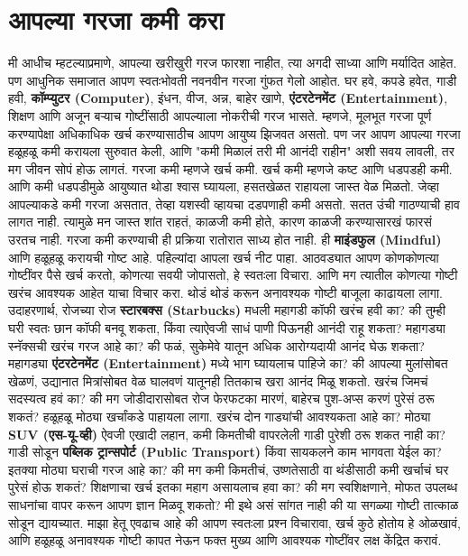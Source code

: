  \chapter{आपल्या गरजा कमी करा}
मी आधीच म्हटल्याप्रमाणे, आपल्या खरीखुरी गरज फारशा नाहीत, त्या अगदी साध्या आणि मर्यादित आहेत. पण आधुनिक समाजात आपण स्वतःभोवती नवनवीन गरजा गुंफत गेलो आहोत. घर हवे, कपडे हवेत, गाडी हवी, \textbf{कॉम्प्युटर (Computer)}, इंधन, वीज, अन्न, बाहेर खाणे, \textbf{एंटरटेनमेंट (Entertainment)}, शिक्षण आणि अजून बऱ्याच गोष्टींसाठी आपल्याला नोकरीची गरज भासते. म्हणजे, मूलभूत गरजा पूर्ण करण्यापेक्षा अधिकाधिक खर्च करण्यासाठीच आपण आयुष्य झिजवत असतो.
पण जर आपण आपल्या गरजा हळूहळू कमी करायला सुरुवात केली, आणि "कमी मिळालं तरी मी आनंदी राहीन" अशी सवय लावली, तर मग जीवन सोपं होऊ लागतं. गरजा कमी म्हणजे खर्च कमी. खर्च कमी म्हणजे कष्ट आणि धडपडही कमी. आणि कमी धडपडीमुळे आयुष्यात थोडा श्वास घ्यायला, हसतखेळत राहायला जास्त वेळ मिळतो.
जेव्हा आपल्याकडे कमी गरजा असतात, तेव्हा यशस्वी व्हायचा दडपणाही कमी असतो. सतत उंची गाठण्याची हाव लागत नाही. त्यामुळे मन जास्त शांत राहतं, काळजी कमी होते, कारण काळजी करण्यासारखं फारसं उरतच नाही.
गरजा कमी करण्याची ही प्रक्रिया रातोरात साध्य होत नाही. ही \textbf{माइंडफुल (Mindful)} आणि हळूहळू करायची गोष्ट आहे. पहिल्यांदा आपला खर्च नीट पाहा. आठवड्यात आपण कोणकोणत्या गोष्टींवर पैसे खर्च करतो, कोणत्या सवयी जोपासतो, हे स्वतःला विचारा. आणि मग त्यातील कोणत्या गोष्टी खरंच आवश्यक आहेत याचा विचार करा.
थोडं थोडं करून अनावश्यक गोष्टी बाजूला काढायला लागा. उदाहरणार्थ, रोजच्या रोज \textbf{स्टारबक्स (Starbucks)} मधली महागडी कॉफी खरंच हवी का? की तुम्ही घरी स्वतः छान कॉफी बनवू शकता, किंवा त्याऐवजी साधं पाणी पिऊनही आनंदी राहू शकता? महागड्या स्नॅक्सची खरंच गरज आहे का? की फळं, सुकेमेवे यातून अधिक आरोग्यदायी आनंद घेऊ शकता? महागड्या \textbf{एंटरटेनमेंट (Entertainment)} मध्ये भाग घ्यायलाच पाहिजे का? की आपल्या मुलांसोबत खेळणं, उद्यानात मित्रांसोबत वेळ घालवणं यातूनही तितकाच खरा आनंद मिळू शकतो. खरंच जिमचं सदस्यत्व हवं का? की मग जोडीदारासोबत रोज फेरफटका मारणं, बाहेरच पुश-अप्स करणं पुरेसं ठरू शकतं?
हळूहळू मोठ्या खर्चांकडे पाहायला लागा. खरंच दोन गाड्यांची आवश्यकता आहे का? मोठ्या \textbf{SUV (एस-यू-व्ही)} ऐवजी एखादी लहान, कमी किमतीची वापरलेली गाडी पुरेशी ठरू शकत नाही का? गाडी सोडून \textbf{पब्लिक ट्रान्सपोर्ट (Public Transport)} किंवा सायकलने काम भागवता येईल का? इतक्या मोठ्या घराची गरज आहे का? की मग कमी किमतीचं, उष्णतेसाठी वा थंडीसाठी कमी खर्चाचं घर पुरेसं होऊ शकतं? शिक्षणाचा खर्च इतका महाग असायलाच हवा का? की मग स्वशिक्षणाने, मोफत उपलब्ध साधनांचा वापर करून आपण ज्ञान मिळवू शकतो?
मी इथे असं सांगत नाही की या सगळ्या गोष्टी तात्काळ सोडून द्यायच्यात. माझा हेतू एवढाच आहे की आपण स्वतःला प्रश्न विचारावा, खर्च कुठे होतोय हे ओळखावं, आणि हळूहळू अनावश्यक गोष्टी कापत नेऊन फक्त मुख्य आणि आवश्यक गोष्टींवर लक्ष केंद्रित करावं.
